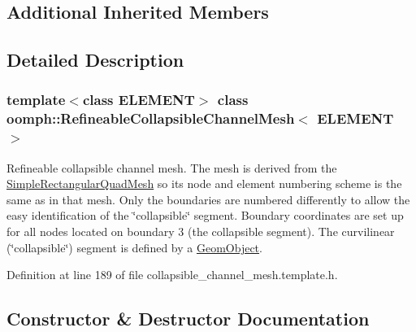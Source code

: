 \subsection*{Additional Inherited Members}


\subsection{Detailed Description}
\subsubsection*{template$<$class E\+L\+E\+M\+E\+NT$>$\newline
class oomph\+::\+Refineable\+Collapsible\+Channel\+Mesh$<$ E\+L\+E\+M\+E\+N\+T $>$}

Refineable collapsible channel mesh. The mesh is derived from the {\ttfamily \hyperlink{classoomph_1_1SimpleRectangularQuadMesh}{Simple\+Rectangular\+Quad\+Mesh}} so it\textquotesingle{}s node and element numbering scheme is the same as in that mesh. Only the boundaries are numbered differently to allow the easy identification of the \char`\"{}collapsible\char`\"{} segment. Boundary coordinates are set up for all nodes located on boundary 3 (the collapsible segment). The curvilinear (\char`\"{}collapsible\char`\"{}) segment is defined by a {\ttfamily \hyperlink{classoomph_1_1GeomObject}{Geom\+Object}}. 

Definition at line 189 of file collapsible\+\_\+channel\+\_\+mesh.\+template.\+h.



\subsection{Constructor \& Destructor Documentation}
\mbox{\label{classoomph_1_1RefineableCollapsibleChannelMesh_a0abc3741a7b74dd543096fb303b96243}} 
